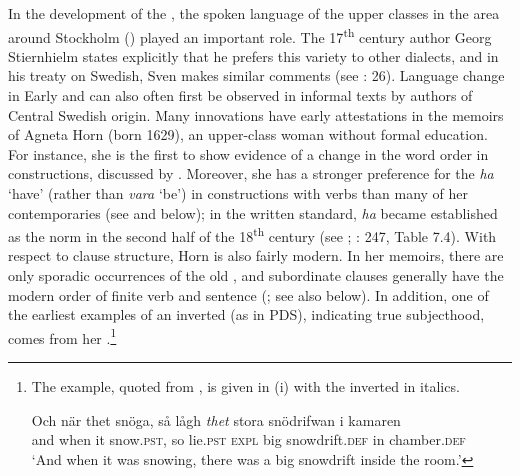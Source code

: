 \documentclass[output=paper]{langscibook}
\begin{document}
In the development of the , the spoken language of the upper classes in the area around Stockholm () played an important role. The 17\textsuperscript{th} century author Georg Stiernhielm states explicitly that he prefers this variety to other dialects, and in his treaty on Swedish, Sven \citet{Hof1753} makes similar comments (see \citealt{Widmark2000}: 26). Language change in Early and  can also often first be observed in informal texts by authors of Central Swedish origin. Many innovations have early attestations in the memoirs of Agneta Horn (born 1629), an upper-class woman without formal education. For instance, she is the first to show evidence of a change in the word order in  constructions, discussed by . Moreover, she has a stronger preference for the  \textit{ha} ‘have’ (rather than \textit{vara} ‘be’) in  constructions with  verbs than many of her contemporaries (see \citealt{Larsson2009} and below); in the written standard, \textit{ha} became established as the norm in the second half of the 18\textsuperscript{th} century (see \citealt{Johannisson1945}; \citealt{Larsson2009}: 247, Table 7.4). With respect to clause structure, Horn is also fairly modern. In her memoirs, there are only sporadic occurrences of the old  \citep{Petzell2011}, and subordinate clauses generally have the modern order of finite verb and sentence  (\citealt{Falk1993}; see also  below). In addition, one of the earliest examples of an inverted  (as in PDS), indicating true subjecthood, comes from her \citep[268]{Falk1993}.\footnote{The example, quoted from \citet[268]{Falk1993}, is given in (i) with the inverted  in italics.

\ea\gll Och  när    thet  snöga,    så  lågh \textit{thet} stora  snödrifwan    i    kamaren\\
        and  when  it      snow.\textsc{pst},  so  lie.\textsc{pst}  \textsc{expl}  big    snowdrift.\textsc{def} in  chamber.\textsc{def}\\
   \glt ‘And when it was snowing, there was a big snowdrift inside the room.’
   \z}
\end{document}
